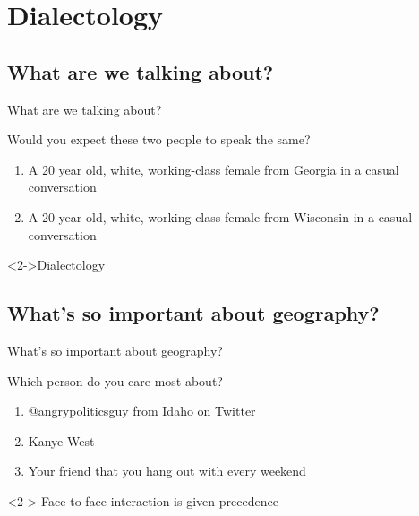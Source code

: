 \documentclass{beamer}
\subtitle[Dialectology]{Dialectology}
\newcommand{\suboneone}{What are we talking about?}
\newcommand{\subonetwo}{What's so important about geography?}
\begin{document}
  

  \section{Dialectology}
    \subsection{\suboneone}
      \begin{frame}{\suboneone}
        \begin{block}{Would you expect these two people to speak the same?}
          \begin{enumerate}
            \item A 20 year old, white, working-class female from \alert<2->{Georgia} in a casual conversation
            \item A 20 year old, white, working-class female from \alert<2->{Wisconsin} in a casual conversation
          \end{enumerate}
        \end{block}
        \begin{alertblock}<2->{Dialectology}
          
        \end{alertblock}
      \end{frame}

    \subsection{\subonetwo}
      \begin{frame}{\subonetwo}
        \begin{block}{Which person do you care most about?}
          \begin{enumerate}
            \item @angrypoliticsguy from Idaho on Twitter
            \item Kanye West
            \item Your friend that you hang out with every weekend
          \end{enumerate}
        \end{block}
        \begin{alertblock}<2->{}
          Face-to-face interaction is given precedence
        \end{alertblock}
      \end{frame}
\end{document}

